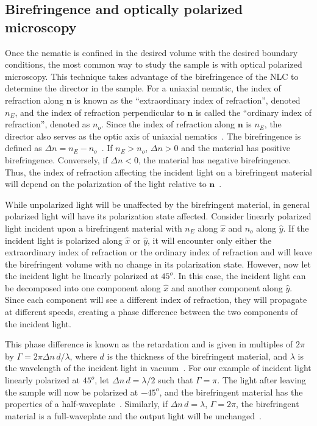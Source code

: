 \subsection{Birefringence and optically polarized microscopy}
Once the nematic is confined in the desired volume with the desired boundary conditions, the most common way to study the sample is with optical polarized microscopy.
This technique takes advantage of the birefringence of the NLC to determine the director in the sample.
For a uniaxial nematic, the index of refraction along $\mathbf{n}$ is known as the ``extraordinary index of refraction'', denoted $n_E$, and the index of refraction perpendicular to $\mathbf{n}$ is called the ``ordinary index of refraction'', denoted as $n_o$.
Since the index of refraction along $\mathbf{n}$ is $n_E$, the director also serves as the optic axis of uniaxial nematics~\cite{RN232}.
The birefringence is defined as $\Delta n = n_E-n_o$~\cite{RN232}.
If $n_E > n_o$, $\Delta n > 0$ and the material has positive birefringence.
Conversely, if $\Delta n < 0$, the material has negative birefringence.
Thus, the index of refraction affecting the incident light on a birefringent material will depend on the polarization of the light relative to $\mathbf{n}$~\cite{RN232}.

While unpolarized light will be unaffected by the birefringent material, in general polarized light will have its polarization state affected.
Consider linearly polarized light incident upon a birefringent material with $n_E$ along $\hat{x}$ and $n_o$ along $\hat{y}$.
If the incident light is polarized along $\hat{x}$ or $\hat{y}$, it will encounter only either the extraordinary index of refraction or the ordinary index of refraction and will leave the birefringent volume with no change in its polarization state.
However, now let the incident light be linearly polarized at $45^o$.
In this case, the incident light can be decomposed into one component along $\hat{x}$ and another component along $\hat{y}$.
Since each component will see a different index of refraction, they will propagate at different speeds, creating a phase difference between the two components of the incident light.

This phase difference is known as the retardation and is given in multiples of $2 \pi$ by $\Gamma = 2 \pi \Delta n \, d / \lambda$, where $d$ is the thickness of the birefringent material, and $\lambda$ is the wavelength of the incident light in vacuum~\cite{RN232}.
For our example of incident light linearly polarized at $45^o$, let $\Delta n \, d = \lambda / 2$ such that $\Gamma =  \pi$.
The light after leaving the sample will now be polarized at $-45^o$, and the birefringent material has the properties of a half-waveplate~\cite{RN232}.
Similarly, if $\Delta n \, d = \lambda$, $\Gamma =  2 \pi$, the birefringent material is a full-waveplate and the output light will be unchanged~\cite{RN232}.\\

